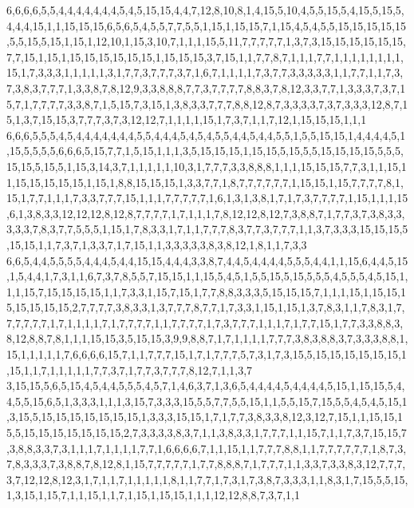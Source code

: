6,6,6,6,5,5,4,4,4,4,4,4,4,5,4,5,15,15,4,4,7,12,8,10,8,1,4,15,5,10,4,5,5,15,5,4,15,5,15,5,4,4,4,15,1,1,15,15,15,6,5,6,5,4,5,5,7,7,5,5,1,15,1,15,15,7,1,15,4,5,4,5,5,15,15,15,15,15,5,5,15,5,15,1,15,1,12,10,1,15,3,10,7,1,1,1,15,5,11,7,7,7,7,7,1,3,7,3,15,15,15,15,15,15,7,7,15,1,15,1,15,15,15,15,15,15,1,15,15,15,3,7,15,1,1,7,7,8,7,1,1,1,7,7,1,1,1,1,1,1,1,1,15,1,7,3,3,3,1,1,1,1,1,3,1,7,7,3,7,7,7,3,7,1,6,7,1,1,1,1,7,3,7,7,3,3,3,3,3,1,1,7,7,1,1,7,3,7,3,8,3,7,7,7,1,3,3,8,7,8,12,9,3,3,8,8,8,7,7,3,7,7,7,7,8,8,3,7,8,12,3,3,7,7,1,3,3,3,7,3,7,15,7,1,7,7,7,7,3,3,8,7,1,5,15,7,3,15,1,3,8,3,3,7,7,7,8,8,12,8,7,3,3,3,3,7,3,7,3,3,3,12,8,7,15,1,3,7,15,15,3,7,7,7,3,7,3,12,12,7,1,1,1,1,15,1,7,3,7,1,1,7,12,1,15,15,15,1,1,1
6,6,6,5,5,5,4,5,4,4,4,4,4,4,4,5,5,4,4,4,5,4,5,4,5,5,4,4,5,4,4,5,5,1,5,5,15,15,1,4,4,4,4,5,1,15,5,5,5,5,6,6,6,5,15,7,7,1,5,15,1,1,1,3,5,15,15,15,1,15,15,5,15,5,5,15,15,15,15,5,5,5,15,15,5,15,5,1,15,3,14,3,7,1,1,1,1,1,10,3,1,7,7,7,3,3,8,8,8,1,1,1,15,15,15,7,7,3,1,1,15,11,15,15,15,15,15,1,15,1,8,8,15,15,15,1,3,3,7,7,1,8,7,7,7,7,7,7,1,15,15,1,15,7,7,7,7,8,1,15,1,7,7,1,1,1,7,3,3,7,7,7,15,1,1,1,7,7,7,7,7,1,6,1,3,1,3,8,1,7,1,7,3,7,7,7,7,1,15,1,1,1,15,6,1,3,8,3,3,12,12,12,8,12,8,7,7,7,7,1,7,1,1,1,7,8,12,12,8,12,7,3,8,8,7,1,7,7,3,7,3,8,3,3,3,3,3,7,8,3,7,7,5,5,5,1,15,1,7,8,3,3,1,7,1,1,7,7,7,8,3,7,7,3,7,7,7,1,1,3,7,3,3,3,15,15,15,5,15,15,1,1,7,3,7,1,3,3,7,1,7,15,1,1,3,3,3,3,3,8,3,8,12,1,8,1,1,7,3,3
6,6,5,4,4,5,5,5,5,4,4,4,5,4,4,15,15,4,4,4,3,3,8,7,4,4,5,4,4,4,4,5,5,5,4,4,1,1,15,6,4,4,5,15,1,5,4,4,1,7,3,1,1,6,7,3,7,8,5,5,7,15,15,1,1,15,5,4,5,1,5,5,15,5,15,5,5,5,4,5,5,5,4,5,15,1,1,1,15,7,15,15,15,15,1,1,7,3,3,1,15,7,15,1,7,7,8,8,3,3,3,5,15,15,15,7,1,1,1,15,1,15,15,15,15,15,15,15,2,7,7,7,7,3,8,3,3,1,3,7,7,7,8,7,7,1,7,3,3,1,15,1,15,1,3,7,8,3,1,1,7,8,3,1,7,7,7,7,7,7,1,7,1,1,1,1,7,1,7,7,7,7,1,1,7,7,7,7,1,7,3,7,7,7,1,1,1,7,1,7,7,15,1,7,7,3,3,8,8,3,8,12,8,8,7,8,1,1,1,15,15,3,5,15,15,3,9,9,8,8,7,1,7,1,1,1,1,7,7,7,3,8,3,8,8,3,7,3,3,3,8,8,1,15,1,1,1,1,1,7,6,6,6,6,15,7,1,1,7,7,7,15,1,7,1,7,7,7,5,7,3,1,7,3,15,5,15,15,15,15,15,15,1,15,1,1,7,1,1,1,1,1,7,7,3,7,1,7,7,3,7,7,7,8,12,7,1,1,3,7
3,15,15,5,6,5,15,4,5,4,4,5,5,5,4,5,7,1,4,6,3,7,1,3,6,5,4,4,4,4,5,4,4,4,4,5,15,1,15,15,5,4,4,5,5,15,6,5,1,3,3,3,1,1,1,3,15,7,3,3,3,15,5,5,7,7,5,5,15,1,1,5,5,15,7,15,5,5,4,5,4,5,15,1,3,15,5,15,15,15,15,15,15,15,1,3,3,3,15,15,1,7,1,7,7,3,8,3,3,8,12,3,12,7,15,1,1,15,15,15,5,15,15,15,15,15,15,15,2,7,3,3,3,3,8,3,7,1,1,3,8,3,3,1,7,7,7,1,1,15,7,1,1,7,3,7,15,15,7,3,8,8,3,3,7,3,1,1,1,7,1,1,1,1,7,7,1,6,6,6,6,7,1,1,15,1,1,7,7,7,8,8,1,1,7,7,7,7,7,7,1,8,7,3,7,8,3,3,3,7,3,8,8,7,8,12,8,1,15,7,7,7,7,7,1,7,7,8,8,8,7,1,7,7,7,1,1,3,3,7,3,3,8,3,12,7,7,7,3,7,12,12,8,12,3,1,7,1,1,7,1,1,1,1,1,8,1,1,7,7,1,7,3,1,7,3,8,7,3,3,3,1,1,8,3,1,7,15,5,5,15,1,3,15,1,15,7,1,1,15,1,1,7,1,15,1,15,15,1,1,1,12,12,8,8,7,3,7,1,1
